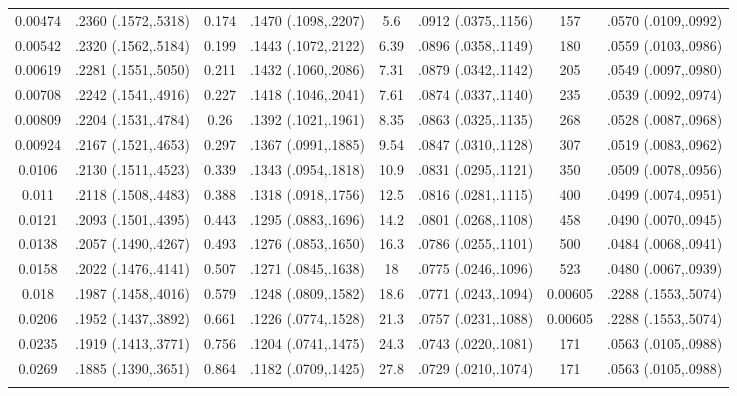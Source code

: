 \begin{longtable}{cccccccc}
  0.00474 & .2360 (.1572,.5318) & 0.174 & .1470 (.1098,.2207) & 5.6 & .0912 (.0375,.1156) & 157 & .0570 (.0109,.0992) \\ 
  0.00542 & .2320 (.1562,.5184) & 0.199 & .1443 (.1072,.2122) & 6.39 & .0896 (.0358,.1149) & 180 & .0559 (.0103,.0986) \\ 
  0.00619 & .2281 (.1551,.5050) & 0.211 & .1432 (.1060,.2086) & 7.31 & .0879 (.0342,.1142) & 205 & .0549 (.0097,.0980) \\ 
  0.00708 & .2242 (.1541,.4916) & 0.227 & .1418 (.1046,.2041) & 7.61 & .0874 (.0337,.1140) & 235 & .0539 (.0092,.0974) \\ 
  0.00809 & .2204 (.1531,.4784) & 0.26 & .1392 (.1021,.1961) & 8.35 & .0863 (.0325,.1135) & 268 & .0528 (.0087,.0968) \\ 
  0.00924 & .2167 (.1521,.4653) & 0.297 & .1367 (.0991,.1885) & 9.54 & .0847 (.0310,.1128) & 307 & .0519 (.0083,.0962) \\ 
  0.0106 & .2130 (.1511,.4523) & 0.339 & .1343 (.0954,.1818) & 10.9 & .0831 (.0295,.1121) & 350 & .0509 (.0078,.0956) \\ 
  0.011 & .2118 (.1508,.4483) & 0.388 & .1318 (.0918,.1756) & 12.5 & .0816 (.0281,.1115) & 400 & .0499 (.0074,.0951) \\ 
  0.0121 & .2093 (.1501,.4395) & 0.443 & .1295 (.0883,.1696) & 14.2 & .0801 (.0268,.1108) & 458 & .0490 (.0070,.0945) \\ 
  0.0138 & .2057 (.1490,.4267) & 0.493 & .1276 (.0853,.1650) & 16.3 & .0786 (.0255,.1101) & 500 & .0484 (.0068,.0941) \\ 
  0.0158 & .2022 (.1476,.4141) & 0.507 & .1271 (.0845,.1638) & 18 & .0775 (.0246,.1096) & 523 & .0480 (.0067,.0939) \\ 
  0.018 & .1987 (.1458,.4016) & 0.579 & .1248 (.0809,.1582) & 18.6 & .0771 (.0243,.1094) & 0.00605 & .2288 (.1553,.5074) \\ 
  0.0206 & .1952 (.1437,.3892) & 0.661 & .1226 (.0774,.1528) & 21.3 & .0757 (.0231,.1088) & 0.00605 & .2288 (.1553,.5074) \\ 
  0.0235 & .1919 (.1413,.3771) & 0.756 & .1204 (.0741,.1475) & 24.3 & .0743 (.0220,.1081) & 171 & .0563 (.0105,.0988) \\ 
  0.0269 & .1885 (.1390,.3651) & 0.864 & .1182 (.0709,.1425) & 27.8 & .0729 (.0210,.1074) & 171 & .0563 (.0105,.0988) \\ 
   \hline
\hline
\label{tab marginalized_risks_eq 2}
\end{longtable}
